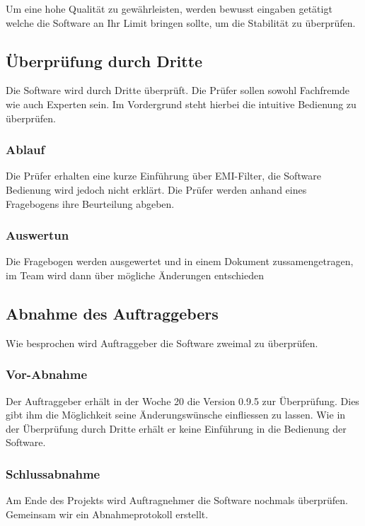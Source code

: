  Um eine hohe Qualität zu gewährleisten, werden bewusst eingaben getätigt welche die Software an Ihr Limit bringen sollte, um die Stabilität zu überprüfen. 

\subsection{Überprüfung durch Dritte} \label{subsec:3}

Die Software wird durch Dritte überprüft. Die Prüfer sollen sowohl Fachfremde wie auch Experten sein. Im Vordergrund steht hierbei die intuitive Bedienung zu überprüfen.

\subsubsection{Ablauf} \label{subsubsec:1}

Die Prüfer erhalten eine kurze Einführung über EMI-Filter, die Software Bedienung wird jedoch nicht erklärt. Die Prüfer werden anhand eines Fragebogens ihre Beurteilung abgeben.

\subsubsection{Auswertun} \label{subsubsec:2}

Die  Fragebogen  werden ausgewertet und  in einem Dokument zussamengetragen, im Team wird dann über mögliche Änderungen entschieden 

\subsection{Abnahme des Auftraggebers} \label{subsec:4}

Wie besprochen wird Auftraggeber die Software zweimal zu überprüfen.

\subsubsection{Vor-Abnahme} \label{subsubsec:1}

Der Auftraggeber erhält in der Woche 20 die Version 0.9.5 zur Überprüfung. Dies gibt ihm die Möglichkeit seine Änderungswünsche einfliessen zu lassen. Wie in der Überprüfung durch Dritte erhält er keine Einführung in die Bedienung der Software.

\subsubsection{Schlussabnahme} \label{subsubsec:2}

Am Ende des Projekts wird Auftragnehmer die Software nochmals überprüfen. Gemeinsam wir ein Abnahmeprotokoll erstellt.
